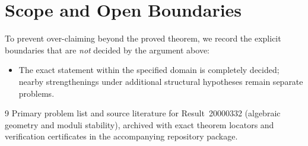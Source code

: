 \documentclass[10pt,reqno]{amsart}
\theoremstyle{definition}
\begin{document}
\section{Scope and Open Boundaries}

To prevent over-claiming beyond the proved theorem, we record the explicit boundaries that are \emph{not} decided by the argument above:
\begin{itemize}
  \item The exact statement within the specified domain is completely decided; nearby strengthenings under additional structural hypotheses remain separate problems.
\end{itemize}

\begin{thebibliography}{9}
Primary problem list and source literature for Result~20000332 (algebraic geometry and moduli stability), archived with exact theorem locators and verification certificates in the accompanying repository package.
\end{thebibliography}
\end{document}
